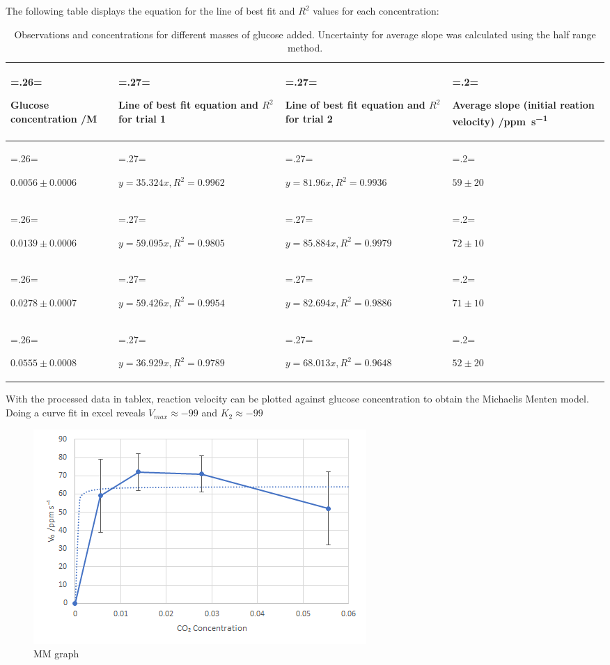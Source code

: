\documentclass{article}
\begin{document}
The following table displays the equation for the line of best fit and $R^2$ values for each concentration:
\begin{table}[H]
\centering
\caption{Observations and concentrations for different masses of glucose added. Uncertainty for average slope was calculated using the half range method.}
\label{table:4}
\begin{tabularx}{\textwidth} {
    | >{\hsize=.26\hsize \linewidth=\hsize \raggedright\arraybackslash}X
    | >{\hsize=.27\hsize \linewidth=\hsize \raggedright\arraybackslash}X
    | >{\hsize=.27\hsize \linewidth=\hsize \raggedright\arraybackslash}X
    | >{\hsize=.2\hsize \linewidth=\hsize \raggedright\arraybackslash}X |}
    \hline
    \textbf{Glucose concentration /\si{M}} & \textbf{Line of best fit equation and $R^2$ for trial 1} & \textbf{Line of best fit equation and $R^2$ for trial 2} & \textbf{Average slope (initial reation velocity) /\si{ppm.s^{-1}}} \\
    \hline
    $0.0056 \pm 0.0006$ & $y=35.324x, R^2=0.9962$ & $y=81.96x, R^2=0.9936$ & $59 \pm 20$ \\
    \hline
    $0.0139 \pm 0.0006$ & $y=59.095x, R^2=0.9805$ & $y=85.884x, R^2=0.9979$ & $72 \pm 10$ \\
    \hline
    $0.0278 \pm 0.0007$ & $y=59.426x, R^2=0.9954$ & $y=82.694x, R^2=0.9886$ & $71 \pm 10$ \\
    \hline
    $0.0555 \pm 0.0008$ & $y=36.929x, R^2=0.9789$ & $y=68.013x, R^2=0.9648$ & $52 \pm 20$ \\
    \hline
\end{tabularx}
\end{table}

With the processed data in tablex, reaction velocity can be plotted against glucose concentration to obtain the Michaelis Menten model. Doing a curve fit in excel reveals $V_{max} \approx -99$ and $K_2 \approx -99$
\begin{figure}[H]
    \renewcommand{\figurename}{Graph}
    \setcounter{figure}{2}
    \centering
    \includegraphics{figures/graph_03.png}
    \vspace*{-12pt}
    \caption{MM graph}
    \label{fig:graph3}
    \renewcommand{\figurename}{Figure}
\end{figure}
\end{document}
